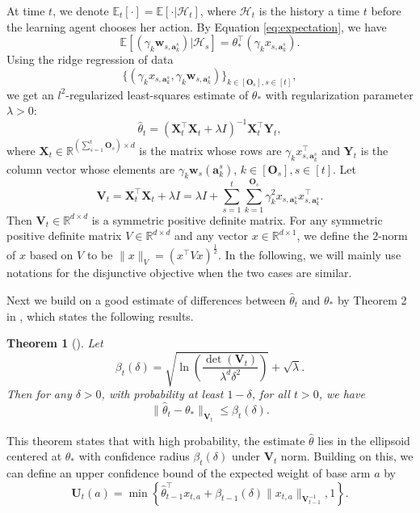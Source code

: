 \documentclass{article}
\newcommand{\EE}{\mathbb{E}}
\newcommand{\RR}{\mathbb{R}}
\newcommand{\ba}{\mathbf{a}}
\newcommand{\bO}{\mathbf{O}}
\newcommand{\bU}{\mathbf{U}}
\newcommand{\bV}{\mathbf{V}}
\newcommand{\bw}{\mathbf{w}}
\newcommand{\bX}{\mathbf{X}}
\newcommand{\bY}{\mathbf{Y}}
\newcommand{\cH}{\mathcal{H}}
\newcommand{\norm}[1]{\| #1 \|}
\newtheorem{theorem}{Theorem}[section]
\newcommand{\wei}[1]{}
\newcommand{\wei}[1]{{\color{blue!50!black}  [\text{Wei:} #1]}}
\begin{document}
At time $t$, we denote $\EE_t[\cdot] = \EE[\cdot | \cH_t]$, where $\cH_t$ is the history a time $t$ before the learning agent
	chooses her action. 
By Equation \eqref{eq:expectation}, we have 
$$
\EE[(\gamma_k \bw_{s,\ba_k^s}) | \cH_{s}] = \theta_*^{\top} (\gamma_k x_{s,\ba_k^s}).
$$
Using the ridge regression of data 
$$
\{(\gamma_k x_{s,\ba_k^s}, \gamma_k \bw_{s,\ba_k^s})\}_{k \in[\bO_s], s\in[t]},
$$
we get an $l^2$-regularized least-squares estimate of $\theta_*$ with regularization parameter $\lambda > 0$:
\begin{equation}
\hat{\theta}_t = (\bX_t^{\top}\bX_t + \lambda I)^{-1} \bX_t^{\top} \bY_t,
\end{equation}
where $\bX_t \in \RR^{(\sum_{s=1}^{t}\bO_s) \times d}$ is the matrix whose rows are $\gamma_k x_{s,\ba_k^s}^{\top}$ and $\bY_t$ is the column vector whose elements are $\gamma_k \bw_s(\ba_k^s)$, $k \in[\bO_s], s\in[t]$. Let
$$
\bV_t = \bX_t^{\top} \bX_t + \lambda I = \lambda I + \sum_{s=1}^{t} \sum_{k=1}^{\bO_s} \gamma_k^2 x_{s,\ba_k^s}x_{s,\ba_k^s}^{\top}.
$$
Then $\bV_t \in \RR^{d \times d}$ is a symmetric positive definite matrix. 
For any symmetric positive definite matrix $V \in \RR^{d \times d} $ and any
	vector $x \in \RR^{d \times 1}$, we define the $2$-norm of $x$ based on
	$V$ to be $\norm{x}_V = (x^{\top} V x)^{\frac{1}{2}}$.
In the following, we will mainly use notations for the disjunctive objective when the two cases are similar.

Next we build on a good estimate of differences between $\hat{\theta}_t$ and $\theta_*$ by Theorem 2 in \cite{abbasi2011improved}, which states the following results.
	
\begin{theorem}[\cite{abbasi2011improved}]
\label{thm:theta_estimate}
Let 
$$
\beta_{t}(\delta) = \sqrt{\ln\left(\frac{\det(\bV_{t})}{\lambda^d \delta^2}\right)} + \sqrt{\lambda}.
$$
Then for any $\delta > 0$, with probability at least $1 - \delta$, for all $t > 0$, we have
\begin{equation}
\label{eq:estimateTheta}
\norm{\hat{\theta}_t - \theta_{\ast}}_{\bV_{t}} \leq \beta_{t}(\delta).
\end{equation}
\end{theorem}

This theorem states that with high probability, the estimate $\hat{\theta}$ lies in the ellipsoid centered at $\theta_*$  with confidence radius $\beta_t(\delta)$ under $\bV_t$ norm. Building on this, we can define an upper confidence bound of the expected weight of base arm $a$ by
\begin{equation}
\label{eq:defU}
\bU_t(a) = \min\left\{\hat{\theta}_{t-1}^{\top}x_{t,a} + \beta_{t-1}(\delta)\norm{x_{t,a}}_{\bV_{t-1}^{-1}}, 1 \right\}.
\end{equation}
\end{document}
